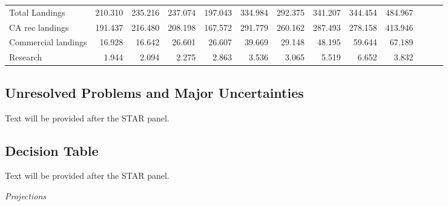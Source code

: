 \documentclass[11pt,
  english,
  a4paper,
]{article}
\begin{document}
\begin{table}
{\begin{tabular}[t]{lrrrrrrrrrrrr}
\hspace{1em}Total Landings & 210.310 & 235.216 & 237.074 & 197.043 & 334.984 & 292.375 & 341.207 & 344.454 & 484.967 &  &  & \\
\hspace{1em}CA rec landings & 191.437 & 216.480 & 208.198 & 167.572 & 291.779 & 260.162 & 287.493 & 278.158 & 413.946 &  &  & \\
\hspace{1em}Commercial landings & 16.928 & 16.642 & 26.601 & 26.607 & 39.669 & 29.148 & 48.195 & 59.644 & 67.189 &  &  & \\
\hspace{1em}Research & 1.944 & 2.094 & 2.275 & 2.863 & 3.536 & 3.065 & 5.519 & 6.652 & 3.832 &  &  & \\
\bottomrule
\end{tabular}}
\end{table}


\hypertarget{unresolved-problems-and-major-uncertainties}{%
\subsection*{Unresolved Problems and Major Uncertainties}\label{unresolved-problems-and-major-uncertainties}}

\leavevmode\tagmcend\tagstructend

Text will be provided after the STAR panel.


\hypertarget{decision-table}{%
\subsection*{Decision Table}\label{decision-table}}

\leavevmode\tagmcend\tagstructend

Text will be provided after the STAR panel.

\emph{Projections}
\end{document}
